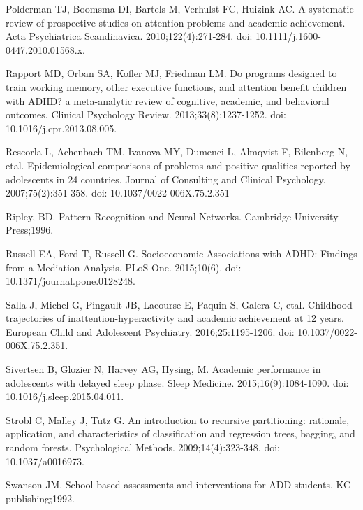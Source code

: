 \documentclass[10pt,letterpaper]{article}
\begin{document}
{{\begin{thebibliography}{10}
Polderman TJ, Boomsma DI, Bartels M, Verhulst FC, Huizink AC.
\newblock A systematic review of prospective studies on attention problems and
  academic achievement.
\newblock Acta Psychiatrica Scandinavica. 2010;122(4):271-284. doi: 10.1111/j.1600-0447.2010.01568.x.

Rapport MD, Orban SA, Kofler MJ, Friedman LM.
\newblock Do programs designed to train working memory, other executive
  functions, and attention benefit children with {ADHD}? a meta-analytic review
  of cognitive, academic, and behavioral outcomes.
\newblock Clinical Psychology Review. 2013;33(8):1237-1252. doi: 10.1016/j.cpr.2013.08.005.

Rescorla L, Achenbach TM, Ivanova MY, Dumenci L, 
  Almqvist F, Bilenberg N, etal. 
\newblock Epidemiological comparisons of problems and positive qualities
  reported by adolescents in 24 countries.
\newblock Journal of Consulting and Clinical Psychology. 2007;75(2):351-358. doi: 10.1037/0022-006X.75.2.351

Ripley, BD.
\newblock Pattern Recognition and Neural Networks.
\newblock Cambridge University Press;1996.

Russell EA, Ford T, Russell G.
\newblock Socioeconomic Associations with ADHD: Findings from a Mediation Analysis.
\newblock PLoS One. 2015;10(6). doi: 10.1371/journal.pone.0128248. 

Salla J, Michel G, Pingault JB, Lacourse E, 
  Paquin S, Galera C, etal. 
\newblock Childhood trajectories of inattention-hyperactivity and academic
  achievement at 12 years.
\newblock European Child and Adolescent Psychiatry. 2016;25:1195-1206. doi: 10.1037/0022-006X.75.2.351.

Sivertsen B, Glozier N, Harvey AG, Hysing, M.
\newblock Academic performance in adolescents with delayed sleep phase.
\newblock Sleep Medicine. 2015;16(9):1084-1090. doi: 10.1016/j.sleep.2015.04.011.

Strobl C, Malley J, Tutz G.
\newblock An introduction to recursive partitioning: rationale, application,
  and characteristics of classification and regression trees, bagging, and
  random forests.
\newblock Psychological Methods. 2009;14(4):323-348. doi: 10.1037/a0016973.

Swanson JM.
\newblock School-based assessments and interventions for ADD students. 
\newblock KC publishing;1992.


\end{thebibliography}}}
\end{document}
